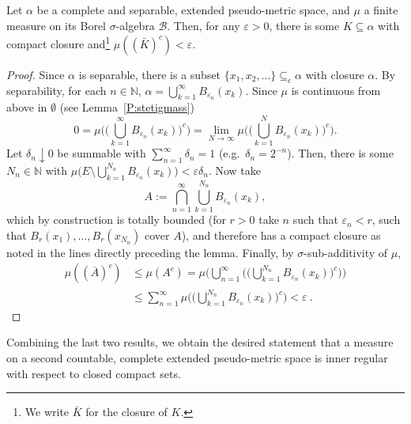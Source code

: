 \documentclass[lean]{AFM}
\begin{document}
\begin{lemma}\label{L:relcoPol}
  Let $\alpha$ be a complete and separable, extended pseudo-metric
  space, and $\mu$ a finite measure on its Borel $\sigma$-algebra
  $\mathcal B$. Then, for any $\varepsilon>0$, there is some
  $K\subseteq \alpha$ with compact closure and\footnote{We write $\bar
    K$ for the closure of $K$.}  $\mu((\bar K)^c)<\varepsilon$.
\end{lemma}

\begin{proof}
 Since $\alpha$ is separable, there is a subset $\{x_1, x_2,...\}
 \subseteq_c \alpha$ with closure $\alpha$. By separability, for each
 $n\in \mathbb N$, $\alpha = \bigcup_{k=1}^\infty
 B_{\varepsilon_n}(x_k)$. Since $\mu$ is continuous from above in
 $\emptyset$ (see Lemma~\ref{P:stetigmass})
  \[
  0 = \mu\Big(\Big(\bigcup_{k=1}^\infty B_{\varepsilon_n}(x_k)\Big)^c
  \Big) = \lim_{N\to\infty} \mu\Big( \Big(\bigcup_{k=1}^N
  B_{\varepsilon_n}(x_k)\Big)^c\Big).
  \]
  Let $\delta_n\downarrow 0$ be summable with $\sum_{n=1}^\infty
  \delta_n = 1$ (e.g.\ $\delta_n = 2^{-n}$). Then, there is some
  $N_n\in\mathbb N$ with $\mu\Big( E\setminus \bigcup_{k=1}^{N_n}
  B_{\varepsilon_n}(x_k)\Big) < \varepsilon \delta_n$. Now take
  \[
    A := \bigcap_{n=1}^\infty \bigcup_{k=1}^{N_n}
    B_{\varepsilon_n}(x_k),
  \]
  which by construction is totally bounded (for $r>0$ take $n$ such
  that $\varepsilon_n < r$, such that $B_r(x_1),...,B_r(x_{N_n})$
  cover $A$), and therefore has a compact closure as noted
  in the lines directly preceding the lemma. Finally, by $\sigma$-sub-additivity of $\mu$,
  \begin{align*}
     \mu((\overline A)^c) & \leq \mu(A^c) = \mu\Big(
     \bigcup_{n=1}^\infty \Big(\Big(\bigcup_{k=1}^{N_n}
     B_{\varepsilon_n}(x_k)\Big)^c\Big)\Big) \\ & \leq
     \sum_{n=1}^\infty \mu\Big( \Big(\bigcup_{k=1}^{N_n}
     B_{\varepsilon_n}(x_k)\Big)^c\Big)< \varepsilon
     \: .
  \end{align*}
\end{proof}

Combining the last two results, we obtain the desired statement that a measure on a second countable,
complete extended pseudo-metric space is inner regular with respect to
closed compact sets.

\end{document}
